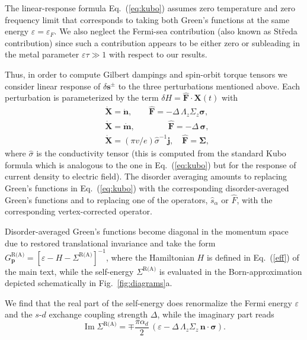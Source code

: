 \documentclass[%
  twocolumn,
  aps,
  prb,
  amsmath,
  amssymb,
  superscriptaddress,
  nofootinbib,
  floatfix
]{revtex4-1}
\newcommand{\be}{\begin{equation}}
\newcommand{\e}{\end{equation}}
\newcommand{\beml}{\begin{subequations}}
\newcommand{\eml}{\end{subequations}}
\newcommand{\ep}{\varepsilon}
\newcommand{\bb}{\boldsymbol}
\newcommand{\0}{^{\phantom{\dagger}}}
\DeclareMathOperator{\im}{Im}
\begin{document}
The linear-response formula Eq.~(\ref{eq:kubo}) assumes zero temperature and zero frequency limit that corresponds to taking both Green's functions at the same energy $\ep=\ep_F$. We also neglect the Fermi-sea contribution (also known as St\v{r}eda contribution) since such a contribution appears to be either zero or subleading in the metal parameter $\ep\tau\gg 1$ with respect to our results.  
 
Thus, in order to compute Gilbert dampings and spin-orbit torque tensors we consider linear response of $\delta\bb{s}^\pm$ to the three perturbations mentioned above. Each perturbation is parameterized by the term $\delta H=\hat{\bb{F}}\cdot \bb{X}(t)$ with
\beml
\label{eq:ops}
\begin{align}
&\dot{\bb{X}}=\dot{\bb{n}},\qquad \hat{\bb{F}}=-\Delta\,\Lambda_z\Sigma_z\bb{\sigma},\\ 
&\dot{\bb{X}}=\dot{\bb{m}},\qquad\qquad\hat{\bb{F}}=-\Delta\, \bb{\sigma},\\
&\dot{\bb{X}}=(\pi v/e)\hat{\sigma}^{-1}\bb{j},\quad \hat{\bb{F}} =\bb{\Sigma},
\end{align}
\eml
where $\hat{\sigma}$ is the conductivity tensor (this is computed from the standard Kubo formula which is analogous to the one in Eq.~(\ref{eq:kubo}) but for the response of current density to electric field). The disorder averaging amounts to replacing Green's functions in Eq.~(\ref{eq:kubo}) with the corresponding disorder-averaged Green's functions and to replacing one of the operators, $\hat{s}_\alpha$ or $\hat{F}$, with the corresponding vertex-corrected operator.

Disorder-averaged Green's functions become diagonal in the momentum space due to restored translational invariance and take the form 
$G^\text{R(A)}_{\bb{p}} = [\ep-H-\Sigma^\textrm{R(A)}]^{-1}$, where the Hamiltonian $H$ is defined in Eq.~(\ref{eff}) of the main text, while the self-energy $\Sigma^\text{R(A)}$ is evaluated in the Born-approximation depicted schematically in Fig.~\ref{fig:diagrams}a. 

We find that the real part of the self-energy does renormalize the Fermi energy $\ep$ and the $s$-$d$ exchange coupling strength $\Delta$, while the imaginary part reads
\be
\im \Sigma^\text{R(A)} = \mp\frac{\pi\alpha_d}{2}\,(\ep-\Delta\,\Lambda_z\Sigma_z\,\bb{n}\cdot\bb{\sigma}).
\e
\end{document}
